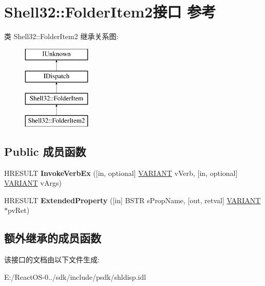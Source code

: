 \hypertarget{interface_shell32_1_1_folder_item2}{}\section{Shell32\+:\+:Folder\+Item2接口 参考}
\label{interface_shell32_1_1_folder_item2}
类 Shell32\+:\+:Folder\+Item2 继承关系图\+:\begin{figure}[H]
\begin{center}
\leavevmode
\includegraphics[height=4.000000cm]{interface_shell32_1_1_folder_item2}
\end{center}
\end{figure}
\subsection*{Public 成员函数}
\begin{DoxyCompactItemize}
\item 
\mbox{\label{interface_shell32_1_1_folder_item2_a26aee54f016aedef2a902d9bc4bde310}} 
H\+R\+E\+S\+U\+LT {\bfseries Invoke\+Verb\+Ex} (\mbox{[}in, optional\mbox{]} \hyperlink{structtag_v_a_r_i_a_n_t}{V\+A\+R\+I\+A\+NT} v\+Verb, \mbox{[}in, optional\mbox{]} \hyperlink{structtag_v_a_r_i_a_n_t}{V\+A\+R\+I\+A\+NT} v\+Args)
\item 
\mbox{\label{interface_shell32_1_1_folder_item2_aea0f27976df4668ce5f52954a798acd5}} 
H\+R\+E\+S\+U\+LT {\bfseries Extended\+Property} (\mbox{[}in\mbox{]} B\+S\+TR s\+Prop\+Name, \mbox{[}out, retval\mbox{]} \hyperlink{structtag_v_a_r_i_a_n_t}{V\+A\+R\+I\+A\+NT} $\ast$pv\+Ret)
\end{DoxyCompactItemize}
\subsection*{额外继承的成员函数}


该接口的文档由以下文件生成\+:\begin{DoxyCompactItemize}
\item 
E\+:/\+React\+O\+S-\/0../sdk/include/psdk/shldisp.\+idl\end{DoxyCompactItemize}
